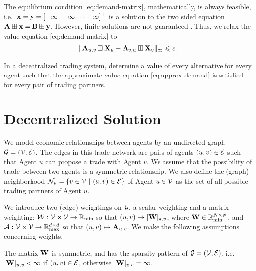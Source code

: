 \documentclass[letterpaper, 10 pt, conference]{ieeeconf}
\begin{document}
The equilibrium condition \eqref{eq:demand-matrix}, mathematically, is always feasible, i.e.~$\mathbf{x} = \mathbf{y} = [-\infty~-\infty \cdots -\infty]^{\top}$ is a solution to the two sided equation $\mathbf{A} \boxplus \mathbf{x} = \mathbf{B} \boxplus \mathbf{y}$. However, finite solutions are not guaranteed \cite{butkovic2006}. Thus, we relax the value equation \eqref{eq:demand-matrix} to
\begin{align}
    \| \mathbf{A}_{u,v} \boxplus \mathbf{X}_{u} - \mathbf{A}_{v,u} \boxplus \mathbf{X}_v \|_{\infty} \leqslant \epsilon . \label{eq:approx-demand}
\end{align}

\begin{problem}\label{prob:approximate}
    In a decentralized trading system, determine a value of every alternative for every agent such that the approximate value equation \eqref{eq:approx-demand} is satisfied for every pair of trading partners.
\end{problem}


\section{Decentralized Solution}
\label{sec:solution}

We model economic relationships between agents by an undirected graph $\mathcal{G} = (\mathcal{V},\mathcal{E})$. The edges in this trade network are pairs of agents $(u,v) \in \mathcal{E}$ such that Agent $u$ can propose a trade with Agent $v$. We assume that the possibility of trade between two agents is a symmetric relationship. We also define the (graph) neighborhood $\mathcal{N}_u = \{v \in \mathcal{V}~\vert~(u,v) \in \mathcal{E} \}$ of Agent $u \in \mathcal{V}$ as the set of all possible trading partners of Agent $u$.

We introduce two (edge) weightings on $\mathcal{G}$, a scalar weighting and a matrix weighting: $\mathcal{W} : \mathcal{V} \times \mathcal{V} \to \mathbb{R}_{\mathrm{min}}$ so that $(u,v) \mapsto [\mathbf{W}]_{u,v}$, where
$\mathbf{W} \in \mathbb{R}_{\mathrm{min}}^{N \times N}$, and $\mathcal{A} : \mathcal{V} \times \mathcal{V} \to \mathbb{R}_{\mathrm{max}}^{d \times d}$ so that $(u,v) \mapsto \mathbf{A}_{u,v}$. We make the following assumptions concerning weights.

\begin{assumption} \label{assume:scalar}
    The matrix $\mathbf{W}$ is symmetric, and has the sparsity pattern of $\mathcal{G} = (\mathcal{V},\mathcal{E})$, i.e.~$[\mathbf{W}]_{u,v} < \infty$ if $(u,v) \in \mathcal{E}$, otherwise  $[\mathbf{W}]_{u,v}=\infty$.
\end{assumption}
\end{document}
